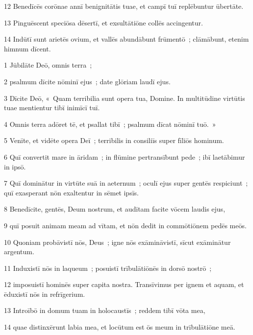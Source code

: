 \psalmVerse
  {\phantom{0}12}
  {Benedīcēs corōnae annī benignitātis tuae, et campī tuī replēbuntur ūbertāte.}


\psalmVerse
  {\phantom{0}13}
  {Pinguēscent speciōsa dēsertī, et exsultātiōne collēs accingentur.}


\psalmVerse
  {\phantom{0}14}
  {Indūtī sunt arietēs ovium, et vallēs abundābunt frūmentō~; clāmābunt, etenim himnum dīcent.}



\psalmVerse
  {\phantom{00}1}
  {Jūbilāte Deō, omnis terra~;}


\psalmVerse
  {\phantom{00}2}
  {psalmum dīcite nōminī ejus~; date glōriam laudī ejus.}


\psalmVerse
  {\phantom{00}3}
  {Dīcite Deō, «~Quam terribilia sunt opera tua, Domine. In multitūdine virtūtis tuae mentientur tibī inimīcī tuī.}


\psalmVerse
  {\phantom{00}4}
  {Omnis terra adōret tē, et psallat tibī~; psalmum dīcat nōminī tuō.~»}


\psalmVerse
  {\phantom{00}5}
  {Venīte, et vidēte opera Deī~; terribilis in consiliīs super fīliōs hominum.}


\psalmVerse
  {\phantom{00}6}
  {Quī convertit mare in āridam~; in flūmine pertransībunt pede~; ibī laetābimur in ipsō.}


\psalmVerse
  {\phantom{00}7}
  {Quī dominātur in virtūte suā in aeternum~; oculī ejus super gentēs respiciunt~; quī exasperant nōn exaltentur in sēmet ipsīs.}


\psalmVerse
  {\phantom{00}8}
  {Benedīcite, gentēs, Deum nostrum, et audītam facite vōcem laudis ejus,}


\psalmVerse
  {\phantom{00}9}
  {quī posuit animam meam ad vītam, et nōn dedit in commōtiōnem pedēs meōs.}


\psalmVerse
  {\phantom{0}10}
  {Quoniam probāvistī nōs, Deus~; igne nōs exāmināvistī, sīcut exāminātur argentum.}


\psalmVerse
  {\phantom{0}11}
  {Induxistī nōs in laqueum~; posuistī trībulātiōnēs in dorsō nostrō~;}


\psalmVerse
  {\phantom{0}12}
  {imposuistī hominēs super capita nostra. Transīvimus per ignem et aquam, et ēduxistī nōs in refrīgerium.}


\psalmVerse
  {\phantom{0}13}
  {Introībō in domum tuam in holocaustīs~; reddem tibī vōta mea,}


\psalmVerse
  {\phantom{0}14}
  {quae distinxērunt labia mea, et locūtum est ōs meum in trībulātiōne meā.}


